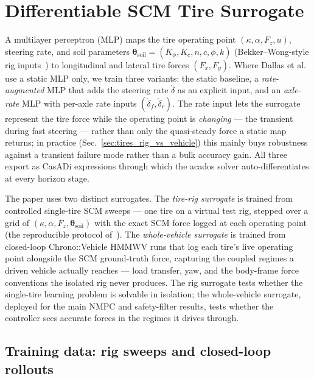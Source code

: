 \documentclass[conference,letterpaper,10pt]{IEEEtran}
\begin{document}
\section{Differentiable SCM Tire Surrogate}
\label{sec:tires}

A multilayer perceptron (MLP) maps the tire operating point
$(\kappa,\alpha,F_z,u)$, steering rate, and soil parameters
$\boldsymbol{\theta}_{\mathrm{soil}}\!=\!(K_\phi,K_c,n,c,\phi,k)$
(Bekker--Wong-style rig inputs~\cite{Shibly05}) to longitudinal and
lateral tire forces $(F_x, F_y)$. Where Dallas et
al.~\cite{Dallas21} use a static MLP only, we train three variants:
the static baseline, a \emph{rate-augmented} MLP that adds the
steering rate $\dot\delta$ as an explicit input, and an
\emph{axle-rate} MLP with per-axle rate inputs
$(\dot\delta_f,\dot\delta_r)$. The rate input lets the surrogate
represent the tire force while the operating point is \emph{changing}
--- the transient during fast steering --- rather than only the
quasi-steady force a static map returns; in practice
(Sec.~\ref{sec:tires_rig_vs_vehicle}) this mainly buys robustness
against a transient failure mode rather than a bulk accuracy gain. All
three export as CasADi expressions through which the acados solver
auto-differentiates at every horizon stage.

The paper uses two distinct surrogates. The \emph{tire-rig surrogate}
is trained from controlled single-tire SCM sweeps --- one tire on a
virtual test rig, stepped over a grid of
$(\kappa,\alpha,F_z,\boldsymbol{\theta}_{\mathrm{soil}})$ with the
exact SCM force logged at each operating point (the reproducible
protocol of~\cite{Dallas21}). The \emph{whole-vehicle surrogate} is
trained from closed-loop Chrono::Vehicle HMMWV runs that log each
tire's live operating point alongside the SCM ground-truth force,
capturing the coupled regimes a driven vehicle actually reaches ---
load transfer, yaw, and the body-frame force conventions the isolated
rig never produces. The rig surrogate tests whether the single-tire
learning problem is solvable in isolation; the whole-vehicle surrogate,
deployed for the main NMPC and safety-filter results, tests whether the
controller sees accurate forces in the regimes it drives through.

\subsection{Training data: rig sweeps and closed-loop rollouts}
\label{sec:tires_rig_to_cl}
\label{sec:training_data}
\end{document}
